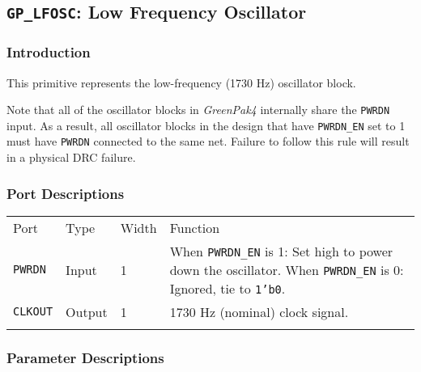 \documentclass[11pt]{article}
\newcommand{\namestyle}[1]{\textit{#1}}
\newcommand{\tokenstyle}[1]{\texttt{#1}}
\newcommand{\datastyle}[1]{\texttt{#1}}
\newcommand{\whenstyle}[1]{{\fontseries{sb}\selectfont#1}}
\newcommand{\thinhline}{\Xhline{1\arrayrulewidth}}
\newcommand{\thickhline}{\Xhline{2.5\arrayrulewidth}}
\begin{document}

\pagebreak
\subsection{\tokenstyle{GP\_LFOSC}: Low Frequency Oscillator}
\label{gp-lfosc}

\subsubsection{Introduction}
This primitive represents the low-frequency (1730 Hz) oscillator block.

Note that all of the oscillator blocks in \namestyle{GreenPak4} internally share the \tokenstyle{PWRDN} input. As a result, all oscillator
blocks in the design that have \tokenstyle{PWRDN\_EN} set to 1 must have \tokenstyle{PWRDN} connected to the same net. Failure to follow this
rule will result in a physical DRC failure.

\subsubsection{Port Descriptions}

\begin{tabularx}{\textwidth}{lllX}
\thinhline
\whenstyle{Port} & \whenstyle{Type} & \whenstyle{Width} & \whenstyle{Function} \\
\thickhline
\tokenstyle{PWRDN} & Input & 1 &
	\whenstyle{When \tokenstyle{PWRDN\_EN} is 1:} Set high to power down the oscillator. \newline
	\whenstyle{When \tokenstyle{PWRDN\_EN} is 0:} Ignored, tie to \datastyle{1'b0}.\\
\thinhline
\tokenstyle{CLKOUT} & Output & 1 & 1730 Hz (nominal) clock signal. \\
\thinhline
\end{tabularx}

\subsubsection{Parameter Descriptions}
\end{document}

